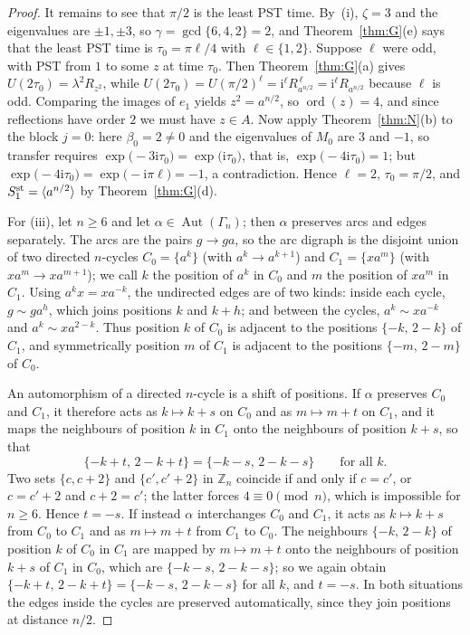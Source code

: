 \documentclass[preprint,11pt]{elsarticle}
\theoremstyle{definition}
\theoremstyle{remark}
\DeclareMathOperator{\ord}{ord}
\DeclareMathOperator{\Aut}{Aut}
\newcommand{\Z}{\mathbb Z}
\newcommand{\ii}{\mathrm i}
\begin{document}
\begin{proof}
It remains to see that $\pi/2$ is the least PST time. By~(i), $\zeta=3$ and the eigenvalues are $\pm1,\pm3$, so $\gamma=\gcd\{6,4,2\}=2$, and Theorem~\ref{thm:G}(e) says that the least PST time is $\tau_0=\pi\ell/4$ with $\ell\in\{1,2\}$. Suppose $\ell$ were odd, with PST from $1$ to some $z$ at time $\tau_0$. Then Theorem~\ref{thm:G}(a) gives $U(2\tau_0)=\lambda^2R_{z^2}$, while $U(2\tau_0)=U(\pi/2)^\ell=\ii^\ell R_{a^{n/2}}^{\,\ell}=\ii^\ell R_{a^{n/2}}$ because $\ell$ is odd. Comparing the images of $e_1$ yields $z^2=a^{n/2}$, so $\ord(z)=4$, and since reflections have order $2$ we must have $z\in A$. Now apply Theorem~\ref{thm:N}(b) to the block $j=0$: here $\beta_0=2\ne0$ and the eigenvalues of $M_0$ are $3$ and $-1$, so transfer requires $\exp\bigl(-3\ii\tau_0\bigr)=\exp\bigl(\ii\tau_0\bigr)$, that is, $\exp\bigl(-4\ii\tau_0\bigr)=1$; but $\exp\bigl(-4\ii\tau_0\bigr)=\exp\bigl(-\ii\pi\ell\bigr)=-1$, a contradiction. Hence $\ell=2$, $\tau_0=\pi/2$, and $S_1^{\rm st}=\langle a^{n/2}\rangle$ by Theorem~\ref{thm:G}(d).

For (iii), let $n\ge6$ and let $\alpha\in\Aut(\Gamma_n)$; then $\alpha$ preserves arcs and edges separately. The arcs are the pairs $g\to ga$, so the arc digraph is the disjoint union of two directed $n$-cycles $C_0=\{a^k\}$ (with $a^k\to a^{k+1}$) and $C_1=\{xa^m\}$ (with $xa^m\to xa^{m+1}$); we call $k$ the position of $a^k$ in $C_0$ and $m$ the position of $xa^m$ in $C_1$. Using $a^kx=xa^{-k}$, the undirected edges are of two kinds: inside each cycle, $g\sim ga^{h}$, which joins positions $k$ and $k+h$; and between the cycles, $a^k\sim xa^{-k}$ and $a^k\sim xa^{2-k}$. Thus position $k$ of $C_0$ is adjacent to the positions $\{-k,\,2-k\}$ of $C_1$, and symmetrically position $m$ of $C_1$ is adjacent to the positions $\{-m,\,2-m\}$ of $C_0$.

An automorphism of a directed $n$-cycle is a shift of positions. If $\alpha$ preserves $C_0$ and $C_1$, it therefore acts as $k\mapsto k+s$ on $C_0$ and as $m\mapsto m+t$ on $C_1$, and it maps the neighbours of position $k$ in $C_1$ onto the neighbours of position $k+s$, so that
\[
\{-k+t,\,2-k+t\}=\{-k-s,\,2-k-s\}\qquad\text{for all }k.
\]
Two sets $\{c,c+2\}$ and $\{c',c'+2\}$ in $\Z_n$ coincide if and only if $c=c'$, or $c=c'+2$ and $c+2=c'$; the latter forces $4\equiv0\pmod n$, which is impossible for $n\ge6$. Hence $t=-s$. If instead $\alpha$ interchanges $C_0$ and $C_1$, it acts as $k\mapsto k+s$ from $C_0$ to $C_1$ and as $m\mapsto m+t$ from $C_1$ to $C_0$. The neighbours $\{-k,\,2-k\}$ of position $k$ of $C_0$ in $C_1$ are mapped by $m\mapsto m+t$ onto the neighbours of position $k+s$ of $C_1$ in $C_0$, which are $\{-k-s,\,2-k-s\}$; so we again obtain $\{-k+t,\,2-k+t\}=\{-k-s,\,2-k-s\}$ for all $k$, and $t=-s$. In both situations the edges inside the cycles are preserved automatically, since they join positions at distance $n/2$.


\end{proof}
\end{document}
